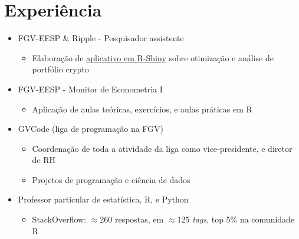 \documentclass[10pt,letterpaper]{article}
\begin{document}
\section{Experiência}
\hspace{-0.6cm}
\begin{minipage}[t]{.47\textwidth}
    \begin{itemize}
        \item FGV-EESP \& Ripple - Pesquisador assistente
        \begin{itemize}
            \item Elaboração de \href{https://github.com/mevaldt/diversified_crypto}{aplicativo em R-Shiny} sobre otimização e análise de portfólio crypto
        \end{itemize}

        \item FGV-EESP - Monitor de Econometria I
        \begin{itemize}
            \item Aplicação de aulas teóricas, exercícios, e aulas práticas em R 
        \end{itemize}
    \end{itemize}
\end{minipage}
\hfill
\begin{minipage}[t]{.47\textwidth}
    \begin{itemize}
        \item GVCode (liga de programação na FGV)
        \begin{itemize}
            \item Coordenação de toda a atividade da liga como vice-presidente, e diretor de RH
            \item Projetos de programação e ciência de dados
        \end{itemize}
        \item Professor particular de estatística, R, e Python
        \begin{itemize}
            \item StackOverflow: $\approx$260 respostas, em $\approx$125 \textit{tags}, top 5\% na comunidade R
        \end{itemize}
    \end{itemize}
\end{minipage}
\end{document}
